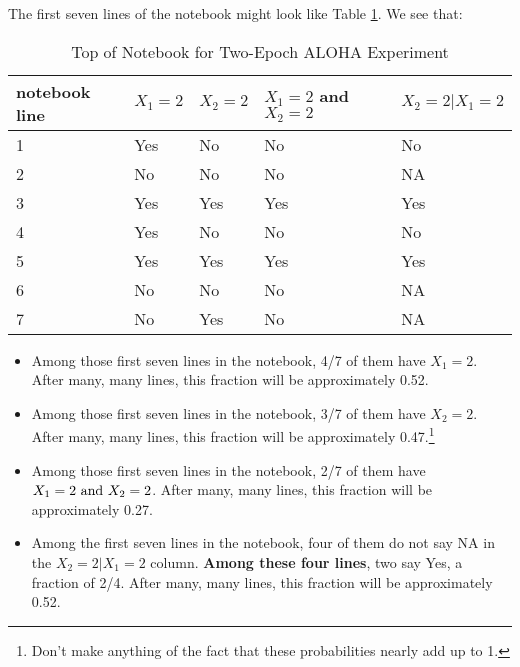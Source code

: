 The first seven lines of the notebook might look like Table
\ref{alohanotebook}.  We see that:

\begin{table}
\begin{center}
\vskip 0.5in

\begin{tabular}{|l|l|l|l|l|}
\hline
notebook line & 
$X_1 = 2$ & 
$X_2 = 2$ & 
$X_1 = 2$ and $X_2 = 2$ & 
$X_2 = 2 | X_1 = 2$  \\ \hline 
\hline
1 & Yes & No & No & No \\ \hline 
2 & No & No & No & NA \\ \hline 
3 & Yes & Yes & Yes & Yes \\ \hline 
4 & Yes & No & No & No \\ \hline 
5 & Yes & Yes & Yes & Yes \\ \hline 
6 & No & No & No & NA \\ \hline 
7 & No & Yes & No & NA \\ \hline 
\end{tabular}

\end{center}
\caption{Top of Notebook for Two-Epoch ALOHA Experiment}
\label{alohanotebook}
\end{table}

\begin{itemize}

\item Among those first seven lines in the notebook, 4/7 of them have
$X_1 = 2$.  After many, many lines, this fraction will be
approximately 0.52.

\item Among those first seven lines in the notebook, 3/7 of them have
$X_2 = 2$.  After many, many lines, this fraction will be
approximately 0.47.\footnote{Don't make anything of the fact that these
probabilities nearly add up to 1.} 

\item Among those first seven lines in the notebook, 2/7 of them have
$X_1 = 2 {\rm ~and~ } X_2 = 2$.  After many, many lines, this fraction
will be approximately 0.27. 

\item Among the first seven lines in the notebook, four of them do not
say NA in the $X_2 = 2 | X_1 = 2$ column.  {\bf Among these four lines},
two say Yes, a fraction of 2/4.  After many, many lines, this
fraction will be approximately 0.52.

\end{itemize}

